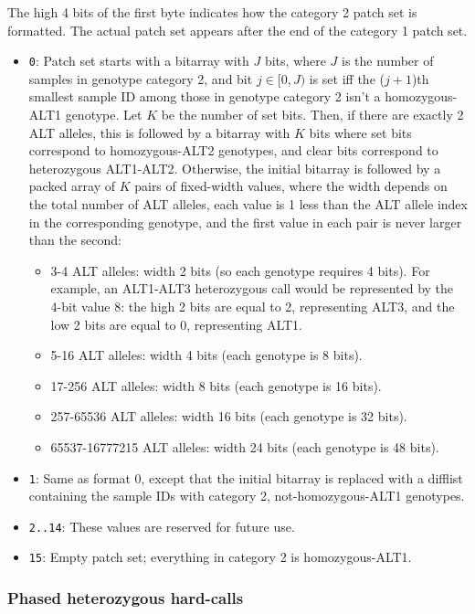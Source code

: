 \documentclass[8pt]{article}
\begin{document}
The high 4 bits of the first byte indicates how the category 2 patch set is
formatted.  The actual patch set appears after the end of the category 1 patch
set.

\begin{itemize}
\item \texttt{0}: Patch set starts with a bitarray with $J$ bits, where $J$ is
  the number of samples in genotype category 2, and bit $j\in [0, J)$ is set
  iff the ($j+1$)th smallest sample ID among those in genotype category 2 isn't
  a homozygous-ALT1 genotype.  Let $K$ be the number of set bits.  Then, if
  there are exactly 2 ALT alleles, this is followed by a bitarray with $K$ bits
  where set bits correspond to homozygous-ALT2 genotypes, and clear bits
  correspond to heterozygous ALT1-ALT2.  Otherwise, the initial bitarray is
  followed by a packed array of $K$ pairs of fixed-width values, where the
  width depends on the total number of ALT alleles, each value is 1 less than
  the ALT allele index in the corresponding genotype, and the first value in
  each pair is never larger than the second:
  \begin{itemize}
  \item 3-4 ALT alleles: width 2 bits (so each genotype requires 4 bits).  For
    example, an ALT1-ALT3 heterozygous call would be represented by the 4-bit
    value 8: the high 2 bits are equal to 2, representing ALT3, and the low 2
    bits are equal to 0, representing ALT1.
  \item 5-16 ALT alleles: width 4 bits (each genotype is 8 bits).
  \item 17-256 ALT alleles: width 8 bits (each genotype is 16 bits).
  \item 257-65536 ALT alleles: width 16 bits (each genotype is 32 bits).
  \item 65537-16777215 ALT alleles: width 24 bits (each genotype is 48 bits).
  \end{itemize}
\item \texttt{1}: Same as format 0, except that the initial bitarray is
  replaced with a difflist containing the sample IDs with category 2,
  not-homozygous-ALT1 genotypes.
\item \texttt{2..14}: These values are reserved for future use.
\item \texttt{15}: Empty patch set; everything in category 2 is
  homozygous-ALT1.
\end{itemize}

\subsubsection{Phased heterozygous hard-calls}
\end{document}
